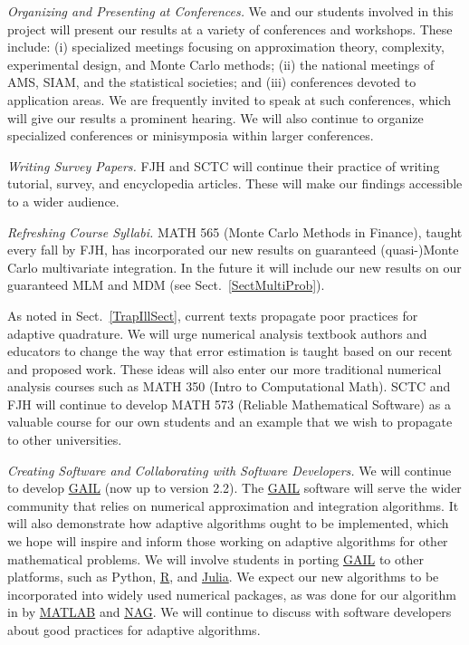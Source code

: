 \documentclass[11pt]{NSFamsart}
\newcommand{\GAIL}{\hyperlink{GAILlink}{GAIL}\xspace}
\newcommand{\NAG}{\hyperlink{NAGlink}{NAG}\xspace}
\newcommand{\MATLAB}{\hyperlink{MATLABlink}{MATLAB}\xspace}
\newcommand{\Rlang}{\hyperlink{Rlink}{R}\xspace}
\newcommand{\Julia}{\hyperlink{Julialink}{Julia}\xspace}
\begin{document}
\emph{Organizing and Presenting at Conferences.}
We and our students involved in this project will present our results at a variety of conferences and 
workshops.  These include: (i) specialized meetings focusing on approximation theory, complexity, 
experimental design, and Monte Carlo methods; (ii) the national meetings of AMS, SIAM, and the 
statistical societies; and (iii) conferences devoted to application areas.  We are frequently invited to 
speak at such conferences, which will give our results a prominent hearing. We will also continue to 
organize specialized conferences or minisymposia within larger conferences.

\emph{Writing Survey Papers.}
FJH and SCTC will continue their practice of writing tutorial, survey, and encyclopedia articles.  These will 
make our findings accessible to a wider audience.

\emph{Refreshing Course Syllabi.}
MATH 565 (Monte Carlo Methods in Finance), taught every fall by FJH, has incorporated our new 
results on guaranteed (quasi-)Monte Carlo multivariate integration. In the future it will include our 
new results on our guaranteed MLM and MDM (see Sect.\ \ref{SectMultiProb}).

As noted in Sect.\ \ref{TrapIllSect}, current texts propagate poor practices for 
adaptive quadrature.  We will urge numerical analysis textbook authors and educators to change the 
way that error estimation is taught based on our recent and proposed work.  These ideas will also 
enter our more traditional numerical analysis courses such as MATH 350 (Intro to Computational 
Math).  SCTC and FJH will continue to develop MATH 573 (Reliable Mathematical Software) as a 
valuable course for our own students and an example that we wish to propagate to other 
universities.

\emph{Creating Software and Collaborating with Software Developers.}
We will continue to develop \GAIL \citep{ChoEtal17b} (now up to version 2.2).  The \GAIL software 
will 
serve the wider community that relies on numerical approximation and integration algorithms.  It will 
also demonstrate how adaptive algorithms ought to be implemented, which we hope will inspire and 
inform those working on adaptive algorithms for other mathematical problems.  We will involve 
students in porting \GAIL to other platforms, such as Python, \Rlang, and \Julia.  We expect our 
new algorithms to be incorporated into widely used numerical packages, as was done for our 
algorithm in \cite{HonHic00a} by \MATLAB and \NAG.  We will continue 
to discuss with software developers about good practices for adaptive algorithms.
\end{document}
